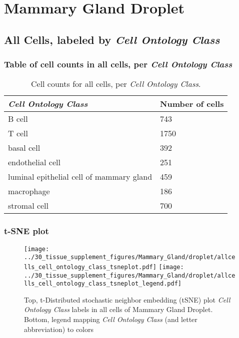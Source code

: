 \clearpage
\section{Mammary Gland Droplet}

\subsection{All Cells, labeled by \emph{Cell Ontology Class}}
\subsubsection{Table of cell counts in all cells, per \emph{Cell Ontology Class}}\begin{table}[h]
\centering
\label{my-label}
\begin{tabular}{@{}ll@{}}
\toprule

\emph{Cell Ontology Class}& Number of cells \\ \midrule
B cell & 743 \\

T cell & 1750 \\

basal cell & 392 \\

endothelial cell & 251 \\

luminal epithelial cell of mammary gland & 459 \\

macrophage & 186 \\

stromal cell & 700 \\
\bottomrule
\end{tabular}
\caption{Cell counts for all cells, per \emph{Cell Ontology Class}.}
\end{table}

\clearpage
\subsubsection{t-SNE plot}
\begin{figure}[h]
\centering
\texttt{[image: ../30\_tissue\_supplement\_figures/Mammary\_Gland/droplet/allcells\_cell\_ontology\_class\_tsneplot.pdf]}
\texttt{[image: ../30\_tissue\_supplement\_figures/Mammary\_Gland/droplet/allcells\_cell\_ontology\_class\_tsneplot\_legend.pdf]}
\caption{Top, t-Distributed stochastic neighbor embedding (tSNE) plot  \emph{Cell Ontology Class} labels in all cells of Mammary Gland Droplet. Bottom, legend mapping \emph{Cell Ontology Class} (and letter abbreviation) to colors}
\end{figure}


